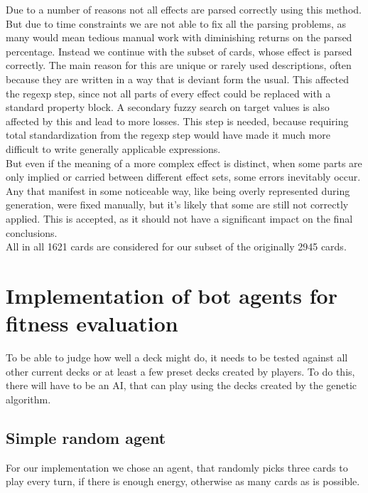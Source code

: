Due to a number of reasons not all effects are parsed correctly using this method. But due to time constraints we are not able to fix all the parsing problems, as many would mean tedious manual work with diminishing returns on the parsed percentage. Instead we continue with the subset of cards, whose effect is parsed correctly. The main reason for this are unique or rarely used descriptions, often because they are written in a way that is deviant form the usual. This affected the regexp step, since not all parts of every effect could be replaced with a standard property block. A secondary fuzzy search on target values is also affected by this and lead to more losses. This step is needed, because requiring total standardization from the regexp step would have made it much more difficult to write generally applicable expressions. \\

But even if the meaning of a more complex effect is distinct, when some parts are only implied or carried between different effect sets, some errors inevitably occur. Any that manifest in some noticeable way, like being overly represented during generation, were fixed manually, but it's likely that some are still not correctly applied. This is accepted, as it should not have a significant impact on the final conclusions. \\ 
All in all 1621 cards are considered for our subset of the originally 2945 cards.\\


\section{Implementation of bot agents for fitness evaluation}
\label{sec:method:agents}
To be able to judge how well a deck might do, it needs to be tested against all other current decks or at least a few preset decks created by players. To do this, there will have to be an AI, that can play using the decks created by the genetic algorithm.

\subsection{Simple random agent}
\label{sec:method:agents:random}
For our implementation we chose an agent, that randomly picks three cards to play every turn, if there is enough energy, otherwise as many cards as is possible. \\

